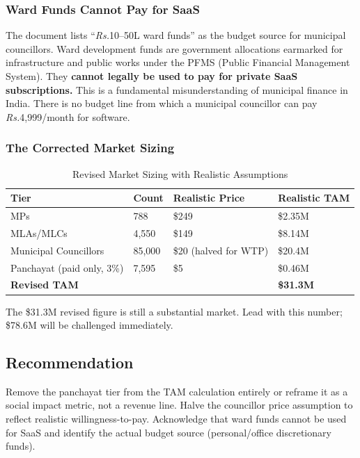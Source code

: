 \documentclass[12pt, a4paper]{article}
\newcommand{\rupee}{\textit{Rs.}}
\begin{document}
\subsubsection{Ward Funds Cannot Pay for SaaS}
The document lists ``\rupee{}10--50L ward funds'' as the budget source for municipal councillors. Ward development funds are government allocations earmarked for infrastructure and public works under the PFMS (Public Financial Management System). They \textbf{cannot legally be used to pay for private SaaS subscriptions.} This is a fundamental misunderstanding of municipal finance in India. There is no budget line from which a municipal councillor can pay \rupee{}4,999/month for software.

\subsubsection{The Corrected Market Sizing}

\begin{table}[h!]
\centering
\caption{Revised Market Sizing with Realistic Assumptions}
\renewcommand{\arraystretch}{1.3}
\begin{tabularx}{\textwidth}{lXXX}
\toprule
\rowcolor{rowblue}
\textbf{Tier} & \textbf{Count} & \textbf{Realistic Price} & \textbf{Realistic TAM} \\
\midrule
MPs & 788 & \$249 & \$2.35M \\
MLAs/MLCs & 4,550 & \$149 & \$8.14M \\
Municipal Councillors & 85,000 & \$20 (halved for WTP) & \$20.4M \\
Panchayat (paid only, 3\%) & 7,595 & \$5 & \$0.46M \\
\midrule
\rowcolor{lightgray}
\textbf{Revised TAM} & \multicolumn{2}{l}{} & \textbf{\$31.3M} \\
\bottomrule
\end{tabularx}
\end{table}

The \$31.3M revised figure is still a substantial market. Lead with this number; \$78.6M will be challenged immediately.

\subsection{Recommendation}
Remove the panchayat tier from the TAM calculation entirely or reframe it as a social impact metric, not a revenue line. Halve the councillor price assumption to reflect realistic willingness-to-pay. Acknowledge that ward funds cannot be used for SaaS and identify the actual budget source (personal/office discretionary funds).
\end{document}
